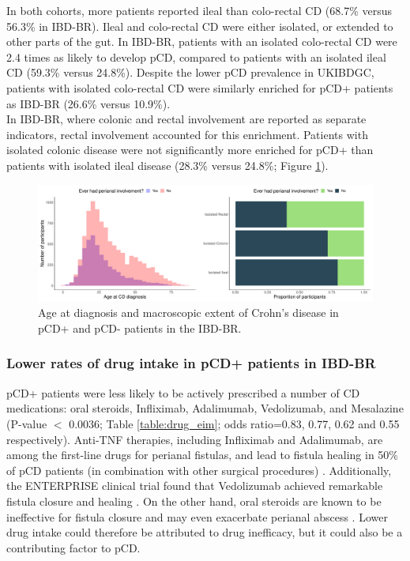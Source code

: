 In both cohorts, more patients reported ileal than colo-rectal CD (68.7\% versus 56.3\% in IBD-BR). Ileal and colo-rectal CD were either isolated, or extended to other parts of the gut. In IBD-BR, patients with an isolated colo-rectal CD were 2.4 times as likely to develop pCD, compared to patients with an isolated ileal CD (59.3\% versus 24.8\%).  Despite the lower pCD prevalence in UKIBDGC, patients with isolated colo-rectal CD were similarly enriched for pCD+ patients as IBD-BR (26.6\% versus 10.9\%). \\

In IBD-BR, where colonic and rectal involvement are reported as separate indicators, rectal involvement accounted for this enrichment. Patients with isolated colonic disease were not significantly more enriched for pCD+ than patients with isolated ileal disease (28.3\% versus 24.8\%; Figure \ref{fig:age_diag_macextent}).
\begin{figure}[htbp!] 
  \centering    
  \includegraphics[width=1.0\textwidth]{fig1}
  \caption[Age at diagnosis and macroscopic extent of Crohn's disease in pCD+ and pCD- patients in the IBD-BR.]{Age at diagnosis and macroscopic extent of Crohn's disease in pCD+ and pCD- patients in the IBD-BR.}
  \label{fig:age_diag_macextent}
  \end{figure}

\subsubsection{Lower rates of drug intake in pCD+ patients in IBD-BR}
pCD+ patients were less likely to be actively prescribed a number of CD medications: oral steroids, Infliximab, Adalimumab, Vedolizumab, and Mesalazine (P-value $<$ 0.0036; Table \ref{table:drug_eim}; odds ratio=0.83, 0.77, 0.62 and 0.55 respectively). Anti-TNF therapies, including Infliximab and Adalimumab, are among the first-line drugs for perianal fistulas, and lead to fistula healing in 50\% of pCD patients (in combination with other surgical procedures) \cite{Regueiro2003-lf,Kotze2014-fh,Haennig2015-pj,Gaertner2007-wb}. Additionally, the ENTERPRISE clinical trial found that Vedolizumab achieved remarkable fistula closure and healing \cite{Schwartz2022-zp}. On the other hand, oral steroids are known to be ineffective for fistula closure and may even exacerbate perianal abscess \cite{Jones1966-tt}. Lower drug intake could therefore be attributed to drug inefficacy, but it could also be a contributing factor to pCD.\\

